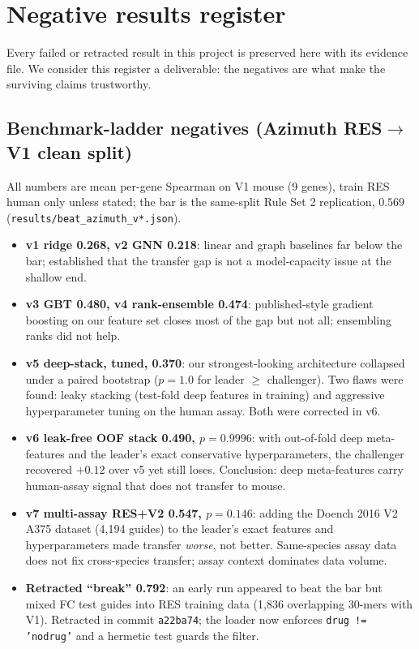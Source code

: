 \section{Negative results register}
Every failed or retracted result in this project is preserved here with its
evidence file. We consider this register a deliverable: the negatives are
what make the surviving claims trustworthy.

\subsection{Benchmark-ladder negatives (Azimuth RES$\to$V1 clean split)}
All numbers are mean per-gene Spearman on V1 mouse (9 genes), train RES
human only unless stated; the bar is the same-split Rule Set 2 replication,
$0.569$ (\texttt{results/beat\_azimuth\_v*.json}).
\begin{itemize}
\item \textbf{v1 ridge 0.268, v2 GNN 0.218}: linear and graph baselines far
below the bar; established that the transfer gap is not a model-capacity
issue at the shallow end.
\item \textbf{v3 GBT 0.480, v4 rank-ensemble 0.474}: published-style
gradient boosting on our feature set closes most of the gap but not all;
ensembling ranks did not help.
\item \textbf{v5 deep-stack, tuned, 0.370}: our strongest-looking
architecture collapsed under a paired bootstrap ($p = 1.0$ for leader
$\geq$ challenger). Two flaws were found: leaky stacking (test-fold deep
features in training) and aggressive hyperparameter tuning on the human
assay. Both were corrected in v6.
\item \textbf{v6 leak-free OOF stack 0.490, $p = 0.9996$}: with
out-of-fold deep meta-features and the leader's exact conservative
hyperparameters, the challenger recovered $+0.12$ over v5 yet still loses.
Conclusion: deep meta-features carry human-assay signal that does not
transfer to mouse.
\item \textbf{v7 multi-assay RES+V2 0.547, $p = 0.146$}: adding the Doench
2016 V2 A375 dataset (4{,}194 guides) to the leader's exact features and
hyperparameters made transfer \emph{worse}, not better. Same-species assay
data does not fix cross-species transfer; assay context dominates data
volume.
\item \textbf{Retracted ``break'' 0.792}: an early run appeared to beat the
bar but mixed FC test guides into RES training data (1{,}836 overlapping
30-mers with V1). Retracted in commit \texttt{a22ba74}; the loader now
enforces \texttt{drug != 'nodrug'} and a hermetic test guards the filter.
\end{itemize}

